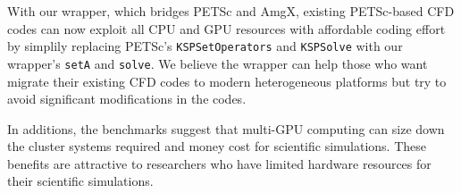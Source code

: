 With our wrapper,
which bridges PETSc and AmgX,
existing PETSc-based CFD codes can now exploit all CPU and GPU resources with affordable coding effort
by simplily replacing PETSc's
\lstinline[language=C++, basicstyle=\ttfamily]|KSPSetOperators| and 
\lstinline[language=C++, basicstyle=\ttfamily]|KSPSolve| 
with our wrapper's
\lstinline[language=C++, basicstyle=\ttfamily]|setA| and
\lstinline[language=C++, basicstyle=\ttfamily]|solve|. 
We believe the wrapper can help those who want migrate their existing CFD codes to modern heterogeneous platforms but try to avoid significant modifications in the codes.

In additions, the benchmarks suggest that multi-GPU computing 
can size down the cluster systems required and money cost for scientific simulations.
These benefits are attractive to researchers who have limited hardware resources for their scientific simulations.
